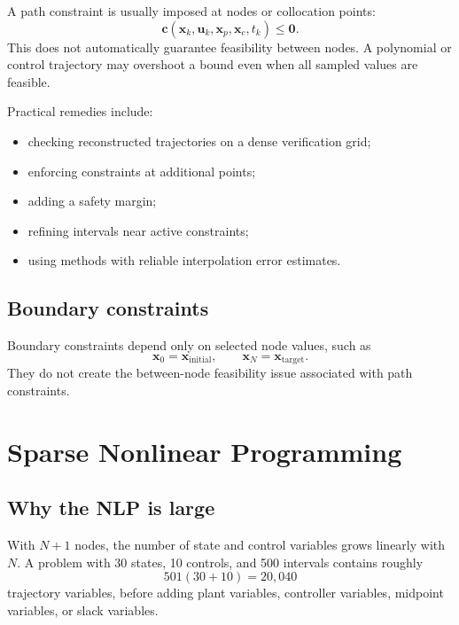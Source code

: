 \documentclass[11pt]{article}
\newcommand{\vect}[1]{\boldsymbol{#1}}
\newcommand{\xp}{\vect{x}_p}
\newcommand{\xc}{\vect{x}_c}
\newcommand{\xstate}{\vect{x}}
\newcommand{\uvec}{\vect{u}}
\newcommand{\cvec}{\vect{c}}
\begin{document}
A path constraint is usually imposed at nodes or collocation points:
\begin{equation}
\cvec(\xstate_k,\uvec_k,\xp,\xc,t_k)\leq\vect{0}.
\end{equation}
This does not automatically guarantee feasibility between nodes. A polynomial or control trajectory may overshoot a bound even when all sampled values are feasible.

Practical remedies include:
\begin{itemize}[leftmargin=1.4em]
  \item checking reconstructed trajectories on a dense verification grid;
  \item enforcing constraints at additional points;
  \item adding a safety margin;
  \item refining intervals near active constraints;
  \item using methods with reliable interpolation error estimates.
\end{itemize}

\subsection{Boundary constraints}

Boundary constraints depend only on selected node values, such as
\begin{equation}
\xstate_0=\xstate_{\mathrm{initial}}, \qquad
\xstate_N=\xstate_{\mathrm{target}}.
\end{equation}
They do not create the between-node feasibility issue associated with path constraints.

\section{Sparse Nonlinear Programming}

\subsection{Why the NLP is large}

With $N+1$ nodes, the number of state and control variables grows linearly with $N$. A problem with 30 states, 10 controls, and 500 intervals contains roughly
\begin{equation}
501(30+10)=20{,}040
\end{equation}
trajectory variables, before adding plant variables, controller variables, midpoint variables, or slack variables.
\end{document}
